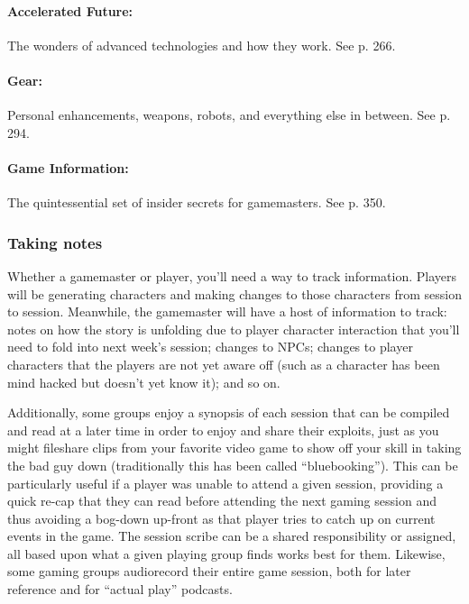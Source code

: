 \paragraph{Accelerated Future:} The wonders of advanced technologies and how they work. See p. 266. 

\paragraph{Gear:} Personal enhancements, weapons, robots, and everything else in between. See p. 294. 

\paragraph{Game Information:} The quintessential set of insider secrets for gamemasters. See p. 350. 



\subsubsection{Taking notes} \label{sec:taking-notes} 

Whether a gamemaster or player, you'll need a way to track information. Players will be generating characters and making changes to those characters from session to session. Meanwhile, the gamemaster will have a host of information to track: notes on how the story is unfolding due to player character interaction that you'll need to fold into next week's session; changes to NPCs; changes to player characters that the players are not yet aware off (such as a character has been mind hacked but doesn't yet know it); and so on. 

Additionally, some groups enjoy a synopsis of each session that can be compiled and read at a later time in order to enjoy and share their exploits, just as you might fileshare clips from your favorite video game to show off your skill in taking the bad guy down (traditionally this has been called ``bluebooking''). This can be particularly useful if a player was unable to attend a given session, providing a quick re-cap that they can read before attending the next gaming session and thus avoiding a bog-down up-front as that player tries to catch up on current events in the game. The session scribe can be a shared responsibility or assigned, all based upon what a given playing group finds works best for them. Likewise, some gaming groups audiorecord their entire game session, both for later reference and for ``actual play'' podcasts. 

